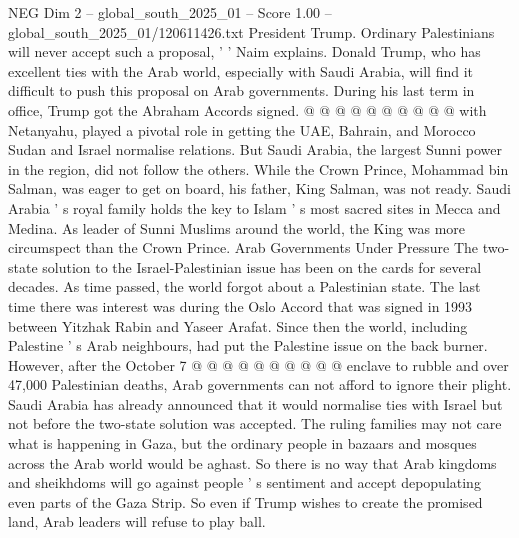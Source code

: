 \begin{textsample}{NEG Dim 2 – global\_south\_2025\_01 – Score 1.00 – global\_south\_2025\_01/120611426.txt}
President Trump.
Ordinary Palestinians will never accept such a proposal, ' ' Naim explains.
Donald Trump, who has excellent ties with the Arab world, especially with Saudi Arabia, will find it difficult to push this proposal on Arab governments.
During his last term in office, Trump got the Abraham Accords signed. @ @ @ @ @ @ @ @ @ @ with Netanyahu, played a pivotal role in getting the UAE, Bahrain, and Morocco Sudan and Israel normalise relations.
But Saudi Arabia, the largest Sunni power in the region, did not follow the others.
While the Crown Prince, Mohammad bin Salman, was eager to get on board, his father, King Salman, was not ready.
Saudi Arabia ' s royal family holds the key to Islam ' s most sacred sites in Mecca and Medina.
As leader of Sunni Muslims around the world, the King was more circumspect than the Crown Prince.
Arab Governments Under Pressure The two-state solution to the Israel-Palestinian issue has been on the cards for several decades.
As time passed, the world forgot about a Palestinian state.
The last time there was interest was during the Oslo Accord that was signed in 1993 between Yitzhak Rabin and Yaseer Arafat.
Since then the world, including Palestine ' s Arab neighbours, had put the Palestine issue on the back burner.
However, after the October 7 @ @ @ @ @ @ @ @ @ @ enclave to rubble and over 47,000 Palestinian deaths, Arab governments can not afford to ignore their plight.
Saudi Arabia has already announced that it would normalise ties with Israel but not before the two-state solution was accepted.
The ruling families may not care what is happening in Gaza, but the ordinary people in bazaars and mosques across the Arab world would be aghast.
So there is no way that Arab kingdoms and sheikhdoms will go against people ' s sentiment and accept depopulating even parts of the Gaza Strip.
So even if Trump wishes to create the promised land, Arab leaders will refuse to play ball.

\end{textsample}
